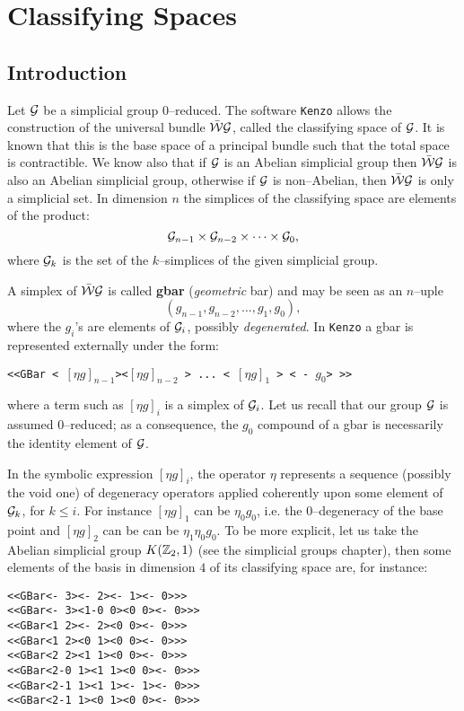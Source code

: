 \chapter {Classifying Spaces}

\section {Introduction}

Let ${\cal G}$ be a simplicial group $0$--reduced. The software  {\tt Kenzo} allows 
the construction of the universal bundle $\bar{\cal W}{\cal G}$, called the 
classifying space of ${\cal G}$. 
It is known that this is the base space of  a principal bundle
such that the total space is contractible. We know also that if ${\cal G}$ is
an Abelian simplicial group then $\bar{\cal W}{\cal G}$ is also an Abelian
simplicial group, otherwise if ${\cal G}$ is non--Abelian, then $\bar{\cal W}{\cal G}$
is only a simplicial set. In dimension $n$ the simplices of the
classifying space are elements of the  product:
$${\cal G}_{n-1}\times {\cal G}_{n-2}\times\cdots\times{\cal G}_0,$$
where ${\cal G}_k$ is the set of the $k$--simplices of the given simplicial group. \par
A simplex of $\bar{\cal W}{\cal G}$ is called {\bf gbar} ({\em geometric} bar) 
and  may be seen as an $n$--uple
$$(g_{n-1}, g_{n-2}, \ldots, g_1, g_0),$$
where the $g_i$'s are elements of ${\cal G}_i$, possibly {\em degenerated}.
In {\tt Kenzo} a gbar is represented externally under the form:
\begin{center}
{\tt <<GBar < $[\eta g]_{n-1}$><$[\eta g]_{n-2}$ > ...  < $[\eta g]_1$ > < - $g_0$> >>}
\end{center}
where  a term such as $[\eta g]_i$ is a simplex of ${\cal G}_i$. Let us recall that
our group ${\cal G}$ is assumed $0$--reduced; as a consequence, the $g_0$ compound
of a gbar is necessarily the identity element of ${\cal G}$. \par
In the  symbolic expression $[\eta g]_i$,  the operator
$\eta$ represents a sequence (possibly the void one) of degeneracy operators
applied coherently upon some element of ${\cal G}_k$, for $k\leq i$. For instance $[\eta g]_1$
can be $\eta_0 g_0$, i.e. the $0$--degeneracy of the base point and $[\eta g]_2$ can be
can be $\eta_1\eta_0 g_0$. To be more explicit, let us take the Abelian simplicial group
$K({{\Bbb Z}}_2, 1)$ (see the simplicial groups chapter), then some elements of the basis in dimension $4$ of
its classifying space are, for instance:
{\footnotesize\begin{verbatim}
<<GBar<- 3><- 2><- 1><- 0>>>
<<GBar<- 3><1-0 0><0 0><- 0>>>
<<GBar<1 2><- 2><0 0><- 0>>>
<<GBar<1 2><0 1><0 0><- 0>>>
<<GBar<2 2><1 1><0 0><- 0>>>
<<GBar<2-0 1><1 1><0 0><- 0>>>
<<GBar<2-1 1><1 1><- 1><- 0>>>
<<GBar<2-1 1><0 1><0 0><- 0>>>
\end{verbatim}}

